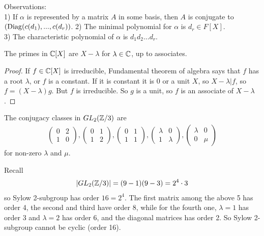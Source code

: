 \documentclass[a4paper]{article}
\begin{document}
Observations:\\
1) If $\alpha$ is represented by a matrix $A$ in some basis, then $A$ is conjugate to $(\operatorname{Diag}(c(d_1),...,c(d_r))$.
2) The minimal polynomial for $\alpha$ is $d_r \in F[X]$.\\
3) The characteristic polynomial of $\alpha$ is $d_1d_2...d_r$.

\begin{lemma}
The primes in $\mathbb{C}[X]$ are $X-\lambda$ for $\lambda \in \mathbb{C}$, up to associates.
\begin{proof}
If $f \in \mathbb{C}[X]$ is irreducible, Fundamental theorem of algebra says that $f$ has a root $\lambda$, or $f$ is a constant. If it is constant it is $0$ or a unit $X$, so $X-\lambda | f$, so $f=(X-\lambda)g$. But $f$ is irreducible. So $g$ is a unit, so $f$ is an associate of $X-\lambda$.
\end{proof}
\end{lemma}

The conjugacy classes in $GL_2(\mathbb{Z}/3)$ are
\begin{equation*}
\begin{aligned}
\left(\begin{matrix}
0 & 2\\
1 & 0
\end{matrix}\right),\left(\begin{matrix}
0 & 1\\
1 & 2
\end{matrix}\right),\left(\begin{matrix}
0 & 1\\
1 & 1
\end{matrix}\right),\left(\begin{matrix}
\lambda & 0\\
1 & \lambda
\end{matrix}\right),\left(\begin{matrix}
\lambda & 0\\
0 & \mu
\end{matrix}\right)
\end{aligned}
\end{equation*}
for non-zero $\lambda$ and $\mu$.

Recall 
\begin{equation*}
\begin{aligned}
|GL_2(\mathbb{Z}/3)| = (9-1)(9-3) = 2^4 \cdot 3
\end{aligned}
\end{equation*}
so Sylow 2-subgroup has order $16=2^4$. The first matrix among the above 5 has order 4, the second and third have order 8, while for the fourth one, $\lambda = 1$ has order 3 and $\lambda =2$ has order 6, and the diagonal matrices has order 2. So Sylow 2-subgroup cannot be cyclic (order 16).
\end{document}
